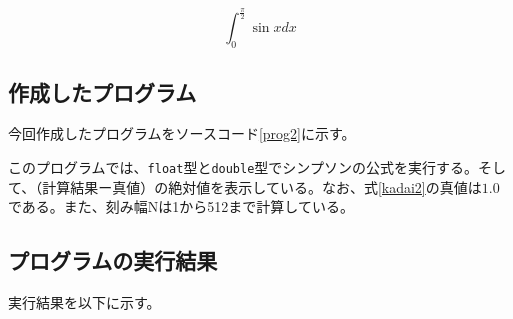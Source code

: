 \documentclass[10pt,titlepage]{jsarticle}
\begin{document}
\begin{equation}
\label{kadai2}
	\int_0^\frac{\pi}{2} \sin x dx
\end{equation}

\subsection{作成したプログラム}
今回作成したプログラムをソースコード\ref{prog2}に示す。



このプログラムでは、{\tt float}型と{\tt double}型でシンプソンの公式を実行する。そして、（計算結果ー真値）の絶対値を表示している。なお、式\ref{kadai2}の真値は$1.0$である。また、刻み幅Nは1から512まで計算している。

\subsection{プログラムの実行結果}
実行結果を以下に示す。
\begin{oframed}
\end{oframed}
\end{document}
